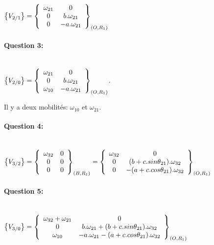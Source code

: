$\left\{V_{2/1}\right\}=\left\{\begin{array}{c c} \omega_{21} & 0\\ 0 & b.\omega_{21} \\ 0 & -a.\omega_{21} \end{array} \right\}_{(O,R_1)}$

\paragraph{Question 3:} ~\ \\

$\left\{V_{2/0}\right\}=\left\{\begin{array}{c c} \omega_{21} & 0\\ 0 & b.\omega_{21} \\ \omega_{10} & -a.\omega_{21} \end{array} \right\}_{(O,R_1)}$.

Il y a deux mobilités: $\omega_{10}$ et $\omega_{21}$.

\paragraph{Question 4:} ~\ \\

$\left\{V_{3/2}\right\}=\left\{\begin{array}{c c} \omega_{32} & 0\\ 0 & 0 \\ 0 & 0 \end{array} \right\}_{(B,R_1)}=\left\{\begin{array}{c c} \omega_{32} & 0\\ 0 & (b+c.sin\theta_{21}).\omega_{32} \\ 0 & -(a+c.cos\theta_{21}).\omega_{32} \end{array} \right\}_{(O,R_1)}$

\paragraph{Question 5:} ~\ \\

$\left\{V_{3/0}\right\}=\left\{\begin{array}{c c} \omega_{32}+\omega_{21} & 0\\ 0 & b.\omega_{21}+(b+c.sin\theta_{21}).\omega_{32} \\ \omega_{10} & -a.\omega_{21}-(a+c.cos\theta_{21}).\omega_{32} \end{array} \right\}_{(O,R_1)}$

